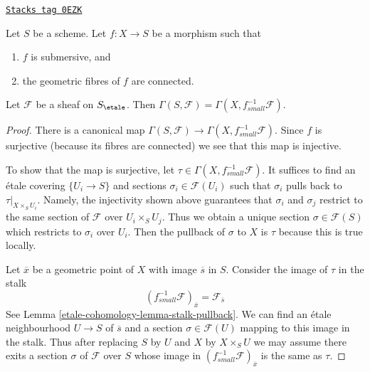 \begin{lemma}
\label{etale-cohomology-lemma-sections-upstairs-submersive}
\href{https://stacks.math.columbia.edu/tag/0EZK}{\texttt{Stacks tag 0EZK}}

Let $S$ be a scheme. Let $f : X \to S$ be a morphism such that
\begin{enumerate}
\item $f$ is submersive, and
\item the geometric fibres of $f$ are connected.
\end{enumerate}
Let $\mathcal{F}$ be a sheaf on $S_\etale$.
Then $\Gamma(S, \mathcal{F}) = \Gamma(X, f^{-1}_{small}\mathcal{F})$.
\end{lemma}

\begin{proof}
There is a canonical map
$\Gamma(S, \mathcal{F}) \to \Gamma(X, f_{small}^{-1}\mathcal{F})$.
Since $f$ is surjective (because its fibres are connected) we see that
this map is injective.

\medskip\noindent
To show that the map is surjective, let
$\tau \in \Gamma(X, f_{small}^{-1}\mathcal{F})$.
It suffices to find
an \'etale covering $\{U_i \to S\}$ and
sections $\sigma_i \in \mathcal{F}(U_i)$
such that $\sigma_i$ pulls back to $\tau|_{X \times_S U_i}$.
Namely, the injectivity shown above guarantees
that $\sigma_i$ and $\sigma_j$ restrict to the same
section of $\mathcal{F}$ over $U_i \times_S U_j$.
Thus we obtain a unique section $\sigma \in \mathcal{F}(S)$
which restricts to $\sigma_i$ over $U_i$.
Then the pullback of $\sigma$ to $X$ is $\tau$
because this is true locally.

\medskip\noindent
Let $\overline{x}$ be a geometric point of $X$ with image $\overline{s}$
in $S$. Consider the image of $\tau$ in the stalk
$$
(f_{small}^{-1}\mathcal{F})_{\overline{x}} = \mathcal{F}_{\overline{s}}
$$
See Lemma \ref{etale-cohomology-lemma-stalk-pullback}.
We can find an \'etale neighbourhood $U \to S$ of $\overline{s}$
and a section $\sigma \in \mathcal{F}(U)$ mapping to this image
in the stalk. Thus after replacing $S$ by $U$ and $X$ by $X \times_S U$
we may assume there exits a section $\sigma$ of $\mathcal{F}$ over $S$
whose image in $(f_{small}^{-1}\mathcal{F})_{\overline{x}}$ is the
same as $\tau$.


\end{proof}
